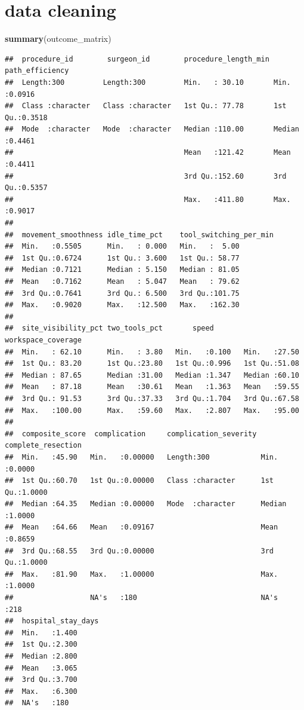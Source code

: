 \documentclass[
]{article}
\newenvironment{Shaded}{\begin{snugshade}}{\end{snugshade}}
\newcommand{\FunctionTok}[1]{\textcolor[rgb]{0.13,0.29,0.53}{\textbf{#1}}}
\newcommand{\NormalTok}[1]{#1}
\begin{document}
\section{data cleaning}\label{data-cleaning}

\begin{Shaded}
\begin{Highlighting}[]
\FunctionTok{summary}\NormalTok{(outcome\_matrix)}
\end{Highlighting}
\end{Shaded}

\begin{verbatim}
##  procedure_id        surgeon_id        procedure_length_min path_efficiency 
##  Length:300         Length:300         Min.   : 30.10       Min.   :0.0916  
##  Class :character   Class :character   1st Qu.: 77.78       1st Qu.:0.3518  
##  Mode  :character   Mode  :character   Median :110.00       Median :0.4461  
##                                        Mean   :121.42       Mean   :0.4411  
##                                        3rd Qu.:152.60       3rd Qu.:0.5357  
##                                        Max.   :411.80       Max.   :0.9017  
##                                                                             
##  movement_smoothness idle_time_pct    tool_switching_per_min
##  Min.   :0.5505      Min.   : 0.000   Min.   :  5.00        
##  1st Qu.:0.6724      1st Qu.: 3.600   1st Qu.: 58.77        
##  Median :0.7121      Median : 5.150   Median : 81.05        
##  Mean   :0.7162      Mean   : 5.047   Mean   : 79.62        
##  3rd Qu.:0.7641      3rd Qu.: 6.500   3rd Qu.:101.75        
##  Max.   :0.9020      Max.   :12.500   Max.   :162.30        
##                                                             
##  site_visibility_pct two_tools_pct       speed       workspace_coverage
##  Min.   : 62.10      Min.   : 3.80   Min.   :0.100   Min.   :27.50     
##  1st Qu.: 83.20      1st Qu.:23.80   1st Qu.:0.996   1st Qu.:51.08     
##  Median : 87.65      Median :31.00   Median :1.347   Median :60.10     
##  Mean   : 87.18      Mean   :30.61   Mean   :1.363   Mean   :59.55     
##  3rd Qu.: 91.53      3rd Qu.:37.33   3rd Qu.:1.704   3rd Qu.:67.58     
##  Max.   :100.00      Max.   :59.60   Max.   :2.807   Max.   :95.00     
##                                                                        
##  composite_score  complication     complication_severity complete_resection
##  Min.   :45.90   Min.   :0.00000   Length:300            Min.   :0.0000    
##  1st Qu.:60.70   1st Qu.:0.00000   Class :character      1st Qu.:1.0000    
##  Median :64.35   Median :0.00000   Mode  :character      Median :1.0000    
##  Mean   :64.66   Mean   :0.09167                         Mean   :0.8659    
##  3rd Qu.:68.55   3rd Qu.:0.00000                         3rd Qu.:1.0000    
##  Max.   :81.90   Max.   :1.00000                         Max.   :1.0000    
##                  NA's   :180                             NA's   :218       
##  hospital_stay_days
##  Min.   :1.400     
##  1st Qu.:2.300     
##  Median :2.800     
##  Mean   :3.065     
##  3rd Qu.:3.700     
##  Max.   :6.300     
##  NA's   :180
\end{verbatim}
\end{document}
